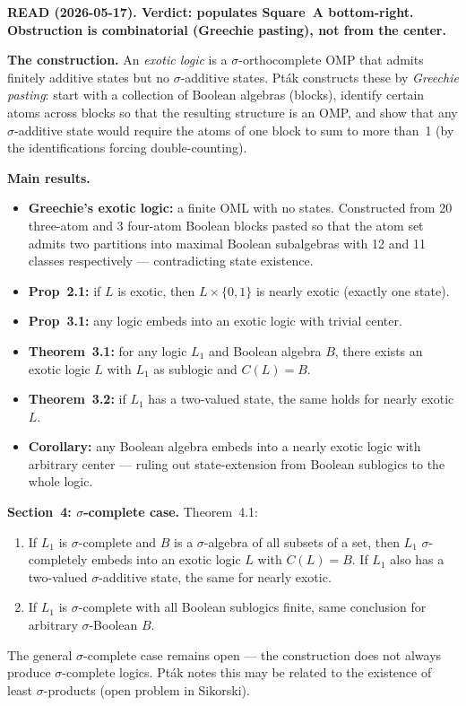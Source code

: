 \textbf{READ (2026-05-17).  Verdict: populates Square~A bottom-right.
Obstruction is combinatorial (Greechie pasting), not from the center.}

\medskip\noindent
\textbf{The construction.}  An \emph{exotic logic} is a
$\sigma$-orthocomplete OMP that admits finitely additive states but no
$\sigma$-additive states.  Pt\'{a}k constructs these by
\emph{Greechie pasting}: start with a collection of Boolean algebras
(blocks), identify certain atoms across blocks so that the resulting
structure is an OMP, and show that any $\sigma$-additive state would
require the atoms of one block to sum to more than~1 (by the
identifications forcing double-counting).

\medskip\noindent
\textbf{Main results.}
\begin{itemize}[nosep]
  \item \textbf{Greechie's exotic logic:} a finite OML with no states.
    Constructed from 20 three-atom and 3 four-atom Boolean blocks
    pasted so that the atom set admits two partitions into maximal
    Boolean subalgebras with 12 and 11 classes respectively ---
    contradicting state existence.
  \item \textbf{Prop~2.1:} if $L$ is exotic, then
    $L \times \{0,1\}$ is nearly exotic (exactly one state).
  \item \textbf{Prop~3.1:} any logic embeds into an exotic logic with
    trivial center.
  \item \textbf{Theorem~3.1:} for any logic $L_1$ and Boolean algebra
    $B$, there exists an exotic logic $L$ with $L_1$ as sublogic
    and $C(L) = B$.
  \item \textbf{Theorem~3.2:} if $L_1$ has a two-valued state, the
    same holds for nearly exotic $L$.
  \item \textbf{Corollary:} any Boolean algebra embeds into a nearly
    exotic logic with arbitrary center --- ruling out state-extension
    from Boolean sublogics to the whole logic.
\end{itemize}

\textbf{Section~4: $\sigma$-complete case.}  Theorem~4.1:
\begin{enumerate}[nosep]
  \item If $L_1$ is $\sigma$-complete and $B$ is a $\sigma$-algebra
    of all subsets of a set, then $L_1$ $\sigma$-completely embeds
    into an exotic logic $L$ with $C(L) = B$.  If $L_1$ also has a
    two-valued $\sigma$-additive state, the same for nearly exotic.
  \item If $L_1$ is $\sigma$-complete with all Boolean sublogics
    finite, same conclusion for arbitrary $\sigma$-Boolean $B$.
\end{enumerate}
The general $\sigma$-complete case remains open --- the construction
does not always produce $\sigma$-complete logics.  Pt\'{a}k notes
this may be related to the existence of least $\sigma$-products
(open problem in Sikorski).

